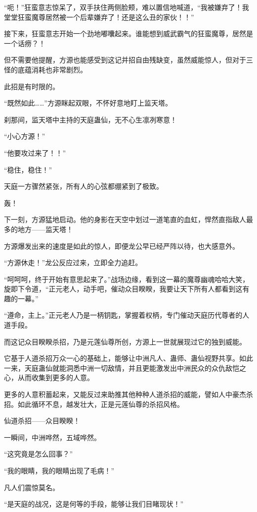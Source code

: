 \begin{this_body}
“呃！”狂蛮意志惊呆了，双手扶住两侧脸颊，难以置信地喊道，“我被嫌弃了！我堂堂狂蛮魔尊居然被一个后辈嫌弃了！还是这么丑的家伙！！”

接下来，狂蛮意志开始一个劲地嘟囔起来。谁能想到威武霸气的狂蛮魔尊，居然是一个话痨？！

但不需要他提醒，方源也能感受到这记并招自由残缺变，虽然威能惊人，但对于三怪的底蕴消耗也非常剧烈。

此招是有时限的。

“既然如此……”方源眯起双眼，不怀好意地盯上监天塔。

刹那间，监天塔中主持的天庭蛊仙，无不心生凛冽寒意！

“小心方源！”

“他要攻过来了！！”

“稳住，稳住！”

天庭一方骤然紧张，所有人的心弦都绷紧到了极致。

轰！

下一刻，方源猛地启动。他的身影在天空中划过一道笔直的血虹，悍然直指敌人最多的地方——监天塔！

方源爆发出来的速度是如此的惊人，即便龙公早已经严阵以待，也大感意外。

“方源休走！”龙公反应过来，立即全力追赶。

“呵呵呵，终于开始有意思起来了。”战场边缘，看到这一幕的魔尊幽魂哈哈大笑，旋即下令道，“正元老人，动手吧，催动众目睽睽，我要让天下所有人都看到这有趣的一幕。”

“遵命，主上。”正元老人乃是一柄钥匙，掌握着权柄，专门催动天庭历代尊者的人道手段。

而这记众目睽睽杀招，乃是元莲仙尊所创，方源上一世就展现过它的独到威能。

它基于人道杀招万众一心的基础上，能够让中洲凡人、蛊师、蛊仙视野共享。如此一来，天庭蛊仙就能洞悉中洲一切敌情，并且更能激发出中洲民众的众仇敌恺之心，从而收集到更多的人意。

更多的人意积蓄起来，又能反过来助推其他种种人道杀招的威能，譬如人中豪杰杀招。如此循环不息，越发壮大，正是元莲仙尊的杀招风格。

仙道杀招——众目睽睽！

一瞬间，中洲哗然，五域哗然。

“这究竟是怎么回事？”

“我的眼睛，我的眼睛出现了毛病！”

凡人们震惊莫名。

“是天庭的战况，这是何等的手段，能够让我们目睹现状！”


\end{this_body}
